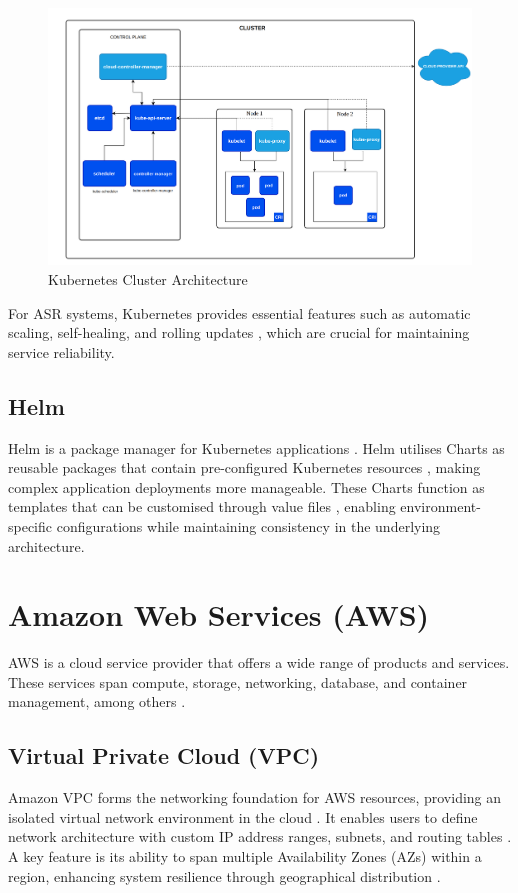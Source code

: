 \begin{figure}[H]
    \centering
    \includegraphics[width=\textwidth]{figures/kubernetes_architecture.png}
    \caption{Kubernetes Cluster Architecture \cite{k8s_cluster}}
    \label{fig:kubernetes_architecture}
\end{figure}

For ASR systems, Kubernetes provides essential features such as automatic scaling, self-healing, and rolling updates \cite{k8s_features}, which are crucial for maintaining service reliability.

\subsection{Helm}
Helm is a package manager for Kubernetes applications \cite{helm_definition}. Helm utilises Charts as reusable packages that contain pre-configured Kubernetes resources \cite{helm_charts}, making complex application deployments more manageable. These Charts function as templates that can be customised through value files \cite{helm_definition}, enabling environment-specific configurations while maintaining consistency in the underlying architecture.

\section{Amazon Web Services (AWS)}
AWS is a cloud service provider that offers a wide range of products and services. These services span compute, storage, networking, database, and container management, among others \cite{aws_definition}.

\subsection{Virtual Private Cloud (VPC)}
Amazon VPC forms the networking foundation for AWS resources, providing an isolated virtual network environment in the cloud \cite{vpc}. It enables users to define network architecture with custom IP address ranges, subnets, and routing tables \cite{vpc}. A key feature is its ability to span multiple Availability Zones (AZs) within a region, enhancing system resilience through geographical distribution \cite{vpc_az}.


